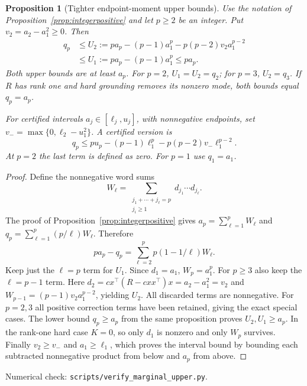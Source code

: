 \documentclass[11pt]{article}
\newtheorem{proposition}[theorem]{Proposition}
\begin{document}
\begin{proposition}[Tighter endpoint-moment upper bounds]
\label{prop:tightendpoint}
Use the notation of Proposition~\ref{prop:integerpositive} and let
$p\geq2$ be an integer. Put $v_2=a_2-a_1^2\geq0$. Then
\begin{align*}
 q_p&\leq U_2:=p a_p-(p-1)a_1^p-p(p-2)v_2a_1^{p-2}\\
    &\leq U_1:=p a_p-(p-1)a_1^p\leq p a_p.
\end{align*}
Both upper bounds are at least $a_p$. For $p=2$, $U_1=U_2=q_2$;
for $p=3$, $U_2=q_3$. If $R$ has rank one and hard grounding
removes its nonzero mode, both bounds equal $q_p=a_p$.

For certified intervals $a_j\in[\ell_j,u_j]$, with nonnegative
endpoints, set $v_- =\max\{0,\ell_2-u_1^2\}$. A certified
version is
\[
 q_p\leq p u_p-(p-1)\ell_1^p
                   -p(p-2)v_-\ell_1^{p-2}.
\]
At $p=2$ the last term is defined as zero. For $p=1$ use $q_1=a_1$.
\end{proposition}
\begin{proof}
Define the nonnegative word sums
\[
 W_\ell=\sum_{\substack{j_1+\cdots+j_\ell=p\\j_i\geq1}}
                d_{j_1}\cdots d_{j_\ell}.
\]
The proof of Proposition~\ref{prop:integerpositive} gives
$a_p=\sum_{\ell=1}^p W_\ell$ and
$q_p=\sum_{\ell=1}^p(p/\ell)W_\ell$. Therefore
\[
 p a_p-q_p=\sum_{\ell=2}^p p(1-1/\ell)W_\ell.
\]
Keep just the $\ell=p$ term for $U_1$. Since $d_1=a_1$,
$W_p=a_1^p$. For $p\geq3$ also keep the $\ell=p-1$ term.
Here $d_2=cx^\top(R-cxx^\top)x=a_2-a_1^2=v_2$ and
$W_{p-1}=(p-1)v_2a_1^{p-2}$, yielding $U_2$.
All discarded terms are nonnegative. For $p=2,3$ all positive
correction terms have been retained, giving the exact special cases.
The lower bound $q_p\geq a_p$ from the same proposition proves
$U_2,U_1\geq a_p$. In the rank-one hard case $K=0$, so only
$d_1$ is nonzero and only $W_p$ survives. Finally
$v_2\geq v_-$ and $a_1\geq\ell_1$, which proves the interval
bound by bounding each subtracted nonnegative product from below
and $a_p$ from above.
\end{proof}
\noindent Numerical check: \texttt{scripts/verify\_marginal\_upper.py}.
\end{document}
